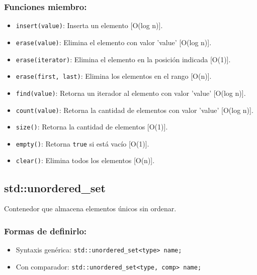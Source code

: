 \subsubsection*{Funciones miembro:}
\begin{itemize}
  \item \texttt{insert(value)}: Inserta un elemento [O(log n)]. 
  \item \texttt{erase(value)}: Elimina el elemento con valor 'value' [O(log n)].
  \item \texttt{erase(iterator)}: Elimina el elemento en la posición indicada [O(1)].
  \item \texttt{erase(first, last)}: Elimina los elementos en el rango [O(n)].
  \item \texttt{find(value)}: Retorna un iterador al elemento con valor 'value' [O(log n)]. 
  \item \texttt{count(value)}: Retorna la cantidad de elementos con valor 'value' [O(log n)]. 
  \item \texttt{size()}: Retorna la cantidad de elementos [O(1)]. 
  \item \texttt{empty()}: Retorna \texttt{true} si está vacío [O(1)]. 
  \item \texttt{clear()}: Elimina todos los elementos [O(n)]. 
\end{itemize}

\subsection{std::unordered\_set}
\label{subsec:std_unordered_set}
Contenedor que almacena elementos únicos sin ordenar. 

\subsubsection*{Formas de definirlo:}
\begin{itemize}
  \item Syntaxis genérica: \texttt{std::unordered\_set<type> name;}
  \item Con comparador: \texttt{std::unordered\_set<type, comp> name;}
\end{itemize}

